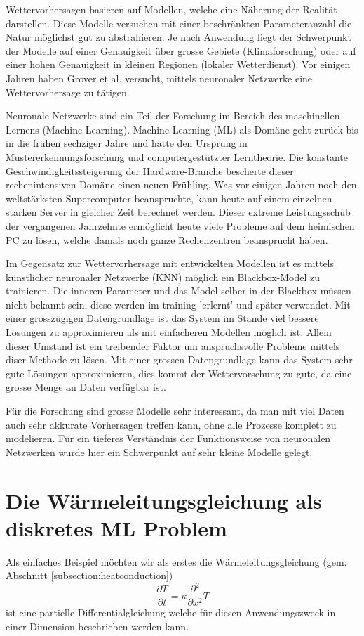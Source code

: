 Wettervorhersagen basieren auf Modellen, welche eine Näherung der Realität darstellen. Diese Modelle versuchen mit einer beschränkten Parameteranzahl die Natur möglichst gut zu abstrahieren. Je nach Anwendung liegt der Schwerpunkt der Modelle auf einer Genauigkeit über grosse Gebiete (Klimaforschung) oder auf einer hohen Genauigkeit in kleinen Regionen (lokaler Wetterdienst). Vor einigen Jahren haben Grover et al. \cite{grover:2015} versucht, mittels neuronaler Netzwerke eine Wettervorhersage zu tätigen.

Neuronale Netzwerke sind ein Teil der Forschung im Bereich des maschinellen Lernens (Machine Learning). Machine Learning (ML) als Domäne geht zurück bis in die frühen sechziger Jahre und hatte den Ursprung in Mustererkennungsforschung und computergestützter Lerntheorie. Die konstante Geschwindigkeitssteigerung der Hardware-Branche bescherte dieser rechenintensiven Domäne einen neuen Frühling. Was vor einigen Jahren noch den weltstärksten Supercomputer beanspruchte, kann heute auf einem einzelnen starken Server in gleicher Zeit berechnet werden. Dieser extreme Leistungsschub der vergangenen Jahrzehnte ermöglicht heute viele Probleme auf dem heimischen PC zu lösen, welche damals noch ganze Rechenzentren beansprucht haben.

Im Gegensatz zur Wettervorhersage mit entwickelten Modellen ist es mittels künstlicher neuronaler Netzwerke (KNN) möglich ein Blackbox-Model zu trainieren. Die inneren Parameter und das Model selber in der Blackbox müssen nicht bekannt sein, diese werden im training 'erlernt' und später verwendet. Mit einer grosszügigen Datengrundlage ist das System im Stande viel bessere Lösungen zu approximieren als mit einfacheren Modellen möglich ist. Allein dieser Umstand ist ein treibender Faktor um anspruchsvolle Probleme mittels diser Methode zu lösen. Mit einer grossen Datengrundlage kann das System sehr gute Lösungen approximieren, dies kommt der Wettervorschung zu gute, da eine grosse Menge an Daten verfügbar ist.

Für die Forschung sind grosse Modelle sehr interessant, da man mit viel Daten auch sehr akkurate Vorhersagen treffen kann, ohne alle Prozesse komplett zu modelieren. Für ein tieferes Verständnis der Funktionsweise von neuronalen Netzwerken wurde hier ein Schwerpunkt auf sehr kleine Modelle gelegt. 

\section{Die Wärmeleitungsgleichung als diskretes ML Problem\label{section:heat-ml}}
Als einfaches Beispiel möchten wir als erstes die Wärmeleitungsgleichung (gem. Abschnitt \ref{subsection:heatconduction}) 
\begin{equation}
\frac{\partial T}{\partial t} = \kappa \frac{\partial^2}{\partial x^2} T
\end{equation}
ist eine partielle Differentialgleichung welche für diesen Anwendungszweck in einer Dimension beschrieben werden kann.

